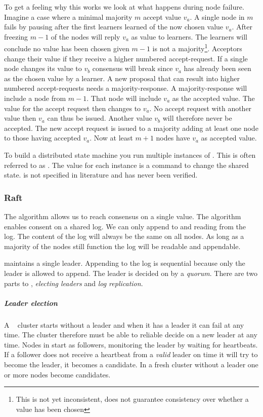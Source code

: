 To get a feeling why this works we look at what happens during node failure. Imagine a case where a minimal majority $m$ accept value $v_a$. A single node in $m$ fails by pausing after the first learners learned of the now chosen value $v_a$. After freezing $m-1$ of the nodes will reply $v_a$ as value to learners. The learners will conclude no value has been chosen given $m-1$ is not a majority\footnote{This is not yet inconsistent, \paxos{} does not guarantee consistency over whether a value has been chosen}. Acceptors change their value if they receive a higher numbered accept-request. If a single node changes its value to $v_b$ consensus will break since $v_a$ has already been seen as the chosen value by a learner. A new proposal that can result into higher numbered accept-requests needs a majority-response. A majority-response will include a node from $m-1$. That node will include $v_a$ as the accepted value. The value for the accept request then changes to $v_a$. No accept request with another value then $v_a$ can thus be issued. Another value $v_b$ will therefore never be accepted. The new accept request is issued to a majority adding at least one node to those having accepted $v_a$. Now at least $m+1$ nodes have $v_a$ as accepted value.

To build a distributed state machine you run multiple instances of \paxos{}. This is often referred to as \multipaxos{}. The value for each instance is a command to change the shared state. \multipaxos{} is not specified in literature and has never been verified.

\subsubsection*{Raft} \label{sec:raft}
The \paxos{} algorithm allows us to reach consensus on a single value. The \raft{} algorithm enables consent on a shared log. We can only append to and reading from the log. The content of the log will always be the same on all nodes. As long as a majority of the nodes still function the log will be readable and appendable.

\raft{} maintains a single leader. Appending to the log is sequential because only the leader is allowed to append. The leader is decided on by a \textit{quorum}. There are two parts to \raft{}, \textit{electing leaders} and \textit{log replication}.

\subparagraph{Leader election} \label{sec:valid}
A \raft{}~\cite{raft} cluster starts without a leader and when it has a leader it can fail at any time. The cluster therefore must be able to reliable decide on a new leader at any time. Nodes in \raft{} start as followers, monitoring the leader by waiting for heartbeats. If a follower does not receive a heartbeat from a \emph{valid} leader on time it will try to become the leader, it becomes a candidate. In a fresh cluster without a leader one or more nodes become candidates.

